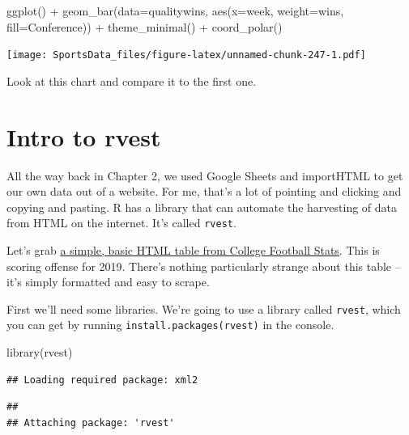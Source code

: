 \documentclass[
]{book}
\newenvironment{Shaded}{\begin{snugshade}}{\end{snugshade}}
\newcommand{\AttributeTok}[1]{\textcolor[rgb]{0.77,0.63,0.00}{#1}}
\newcommand{\FunctionTok}[1]{\textcolor[rgb]{0.00,0.00,0.00}{#1}}
\newcommand{\NormalTok}[1]{#1}
\newcommand{\SpecialCharTok}[1]{\textcolor[rgb]{0.00,0.00,0.00}{#1}}
\begin{document}
\begin{Shaded}
\begin{Highlighting}[]
\FunctionTok{ggplot}\NormalTok{() }\SpecialCharTok{+} \FunctionTok{geom\_bar}\NormalTok{(}\AttributeTok{data=}\NormalTok{qualitywins, }\FunctionTok{aes}\NormalTok{(}\AttributeTok{x=}\NormalTok{week, }\AttributeTok{weight=}\NormalTok{wins, }\AttributeTok{fill=}\NormalTok{Conference)) }\SpecialCharTok{+} \FunctionTok{theme\_minimal}\NormalTok{() }\SpecialCharTok{+} \FunctionTok{coord\_polar}\NormalTok{()}
\end{Highlighting}
\end{Shaded}

\texttt{[image: SportsData\_files/figure-latex/unnamed-chunk-247-1.pdf]}

Look at this chart and compare it to the first one.

\hypertarget{intro-to-rvest}{%
\chapter{Intro to rvest}\label{intro-to-rvest}}

All the way back in Chapter 2, we used Google Sheets and importHTML to get our own data out of a website. For me, that's a lot of pointing and clicking and copying and pasting. R has a library that can automate the harvesting of data from HTML on the internet. It's called \texttt{rvest}.

Let's grab \href{http://www.cfbstats.com/2019/leader/national/team/offense/split01/category09/sort01.html}{a simple, basic HTML table from College Football Stats}. This is scoring offense for 2019. There's nothing particularly strange about this table -- it's simply formatted and easy to scrape.

First we'll need some libraries. We're going to use a library called \texttt{rvest}, which you can get by running \texttt{install.packages(\textquotesingle{}rvest\textquotesingle{})} in the console.

\begin{Shaded}
\begin{Highlighting}[]
\FunctionTok{library}\NormalTok{(rvest)}
\end{Highlighting}
\end{Shaded}

\begin{verbatim}
## Loading required package: xml2
\end{verbatim}

\begin{verbatim}
## 
## Attaching package: 'rvest'
\end{verbatim}
\end{document}

